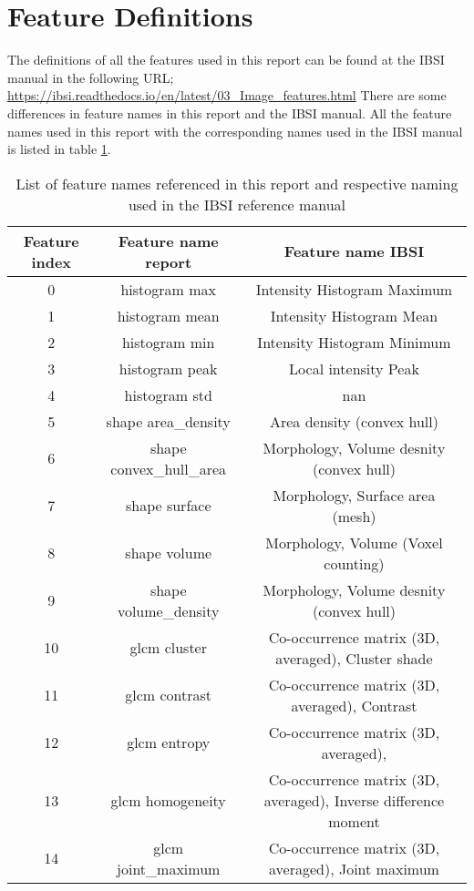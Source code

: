 
\appendix
\section{Feature Definitions} \label{sec:appendix_feature_definitions} 


The definitions of all the features used in this report can be found at the
IBSI manual in the following URL;
\url{https://ibsi.readthedocs.io/en/latest/03_Image_features.html}
There are some differences in feature names in this report and the IBSI manual.
All the feature names used in this report with the corresponding names used in
the IBSI manual is listed in table \ref{tab:feature_names}. 


\begin{table}[H]
    \centering
    \caption{List of feature names referenced in this report and
     respective naming used in the IBSI reference manual}  
    \label{tab:feature_names} 
    \begin{tabular}{|c|c|c|}
        \hline
        Feature index & Feature name report & Feature name IBSI \\
        \hline
        0            & histogram max & Intensity Histogram Maximum \\
        \hline
        1           & histogram mean & Intensity Histogram Mean\\
        \hline
        2            & histogram min & Intensity Histogram Minimum\\
        \hline
        3           & histogram peak & Local intensity Peak\\
        \hline
        4            & histogram std &  nan  \\ 
        \hline
        5       & shape area\_density & Area density (convex hull)\\
        \hline
        6   & shape convex\_hull\_area & Morphology, Volume desnity (convex hull)\\
        \hline
        7            & shape surface & Morphology, Surface area (mesh)\\
        \hline
        8             & shape volume & Morphology, Volume (Voxel counting)\\
        \hline
        9     & shape volume\_density & Morphology, Volume desnity (convex hull)\\
        \hline
        10            & glcm cluster & Co-occurrence matrix (3D, averaged), Cluster shade \\ %
        \hline
        11           & glcm contrast & Co-occurrence matrix (3D, averaged), Contrast\\
        \hline
        12            & glcm entropy & Co-occurrence matrix (3D, averaged),\\ %
        \hline
        13        & glcm homogeneity & Co-occurrence matrix (3D, averaged), Inverse difference moment\\
        \hline
        14      & glcm joint\_maximum & Co-occurrence matrix (3D, averaged), Joint maximum\\
        \hline
    \end{tabular} 
\end{table}

